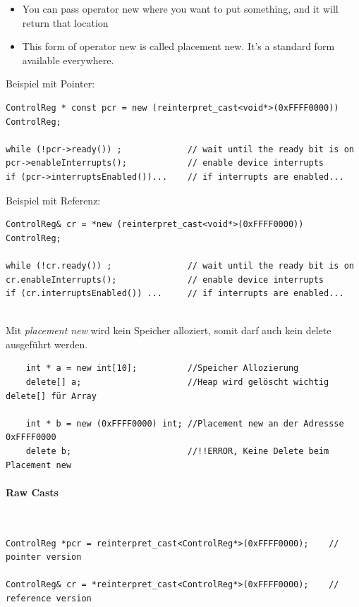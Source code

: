 \begin{itemize}
	\item You can pass operator new where you want to put something, and it will return that location
	\item This form of operator new is called placement new.
			It’s a standard form available everywhere.
\end{itemize}

Beispiel mit Pointer:
\begin{lstlisting}
ControlReg * const pcr = new (reinterpret_cast<void*>(0xFFFF0000)) ControlReg;

while (!pcr->ready()) ; 			// wait until the ready bit is on
pcr->enableInterrupts(); 			// enable device interrupts
if (pcr->interruptsEnabled())... 	// if interrupts are enabled...

\end{lstlisting}

Beispiel mit Referenz:
\begin{lstlisting}
ControlReg& cr = *new (reinterpret_cast<void*>(0xFFFF0000)) ControlReg;

while (!cr.ready()) ; 				// wait until the ready bit is on
cr.enableInterrupts(); 				// enable device interrupts
if (cr.interruptsEnabled()) ... 	// if interrupts are enabled...
\end{lstlisting}
~ \\
Mit \textit{placement new} wird kein Speicher alloziert, somit darf auch kein delete ausgeführt werden.
\begin{lstlisting}
    int * a = new int[10];          //Speicher Allozierung
    delete[] a;                     //Heap wird gelöscht wichtig delete[] für Array

    int * b = new (0xFFFF0000) int; //Placement new an der Adressse 0xFFFF0000
    delete b;                       //!!ERROR, Keine Delete beim Placement new
\end{lstlisting}

\paragraph{Raw Casts}~
\begin{lstlisting}
ControlReg *pcr = reinterpret_cast<ControlReg*>(0xFFFF0000);	// pointer version

ControlReg& cr = *reinterpret_cast<ControlReg*>(0xFFFF0000);	// reference version
\end{lstlisting}



